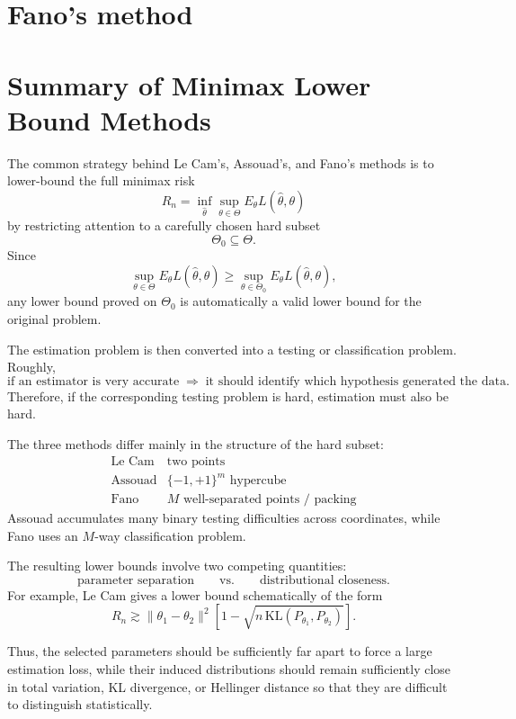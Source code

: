 \documentclass[11pt,twoside]{article}
\begin{document}
\section{Fano's method}

\section{Summary of Minimax Lower Bound Methods}
The common strategy behind Le Cam's, Assouad's, and Fano's methods is to lower-bound the full minimax risk
\[
R_n
=
\inf_{\hat{\theta}}
\sup_{\theta\in\Theta}
E_{\theta}
L(\hat{\theta},\theta)
\]
by restricting attention to a carefully chosen hard subset
\[
\Theta_0\subseteq\Theta.
\]
Since
\[
\sup_{\theta\in\Theta}
E_{\theta}L(\hat{\theta},\theta)
\ge
\sup_{\theta\in\Theta_0}
E_{\theta}L(\hat{\theta},\theta),
\]
any lower bound proved on $\Theta_0$ is automatically a valid lower bound for the original problem.

The estimation problem is then converted into a testing or classification problem. Roughly,
\[
\boxed{
\text{if an estimator is very accurate}
\;\Longrightarrow\;
\text{it should identify which hypothesis generated the data}.
}
\]
Therefore, if the corresponding testing problem is hard, estimation must also be hard.

The three methods differ mainly in the structure of the hard subset:
\[
\boxed{
\begin{array}{c|c}
\text{Le Cam} & \text{two points} \\[2pt]
\text{Assouad} & \{-1,+1\}^m \text{ hypercube} \\[2pt]
\text{Fano} & M \text{ well-separated points / packing}
\end{array}
}
\]
Assouad accumulates many binary testing difficulties across coordinates, while Fano uses an $M$-way classification problem.

The resulting lower bounds involve two competing quantities:
\[
\boxed{
\text{parameter separation}
\qquad \text{vs.} \qquad
\text{distributional closeness}.
}
\]
For example, Le Cam gives a lower bound schematically of the form
\[
R_n
\gtrsim
\|\theta_1-\theta_2\|^2
\left[
1-
\sqrt{
n\,\text{KL}(P_{\theta_1},P_{\theta_2})
}
\right].
\]

Thus, the selected parameters should be sufficiently far apart to force a large estimation loss, while their induced distributions should remain sufficiently close in total variation, KL divergence, or Hellinger distance so that they are difficult to distinguish statistically.
\end{document}
